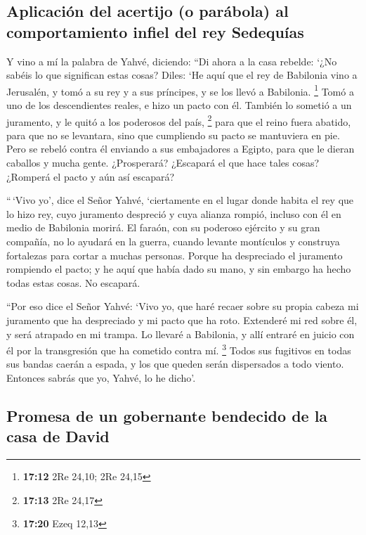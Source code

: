 \hypertarget{aplicaciuxf3n-del-acertijo-o-paruxe1bola-al-comportamiento-infiel-del-rey-sedequuxedas}{%
\subsection{Aplicación del acertijo (o parábola) al comportamiento
infiel del rey
Sedequías}\label{aplicaciuxf3n-del-acertijo-o-paruxe1bola-al-comportamiento-infiel-del-rey-sedequuxedas}}

 Y vino a mí la palabra de Yahvé, diciendo:
 ``Di ahora a la casa rebelde: `¿No sabéis lo que
significan estas cosas? Diles: `He aquí que el rey de Babilonia vino a
Jerusalén, y tomó a su rey y a sus príncipes, y se los llevó a
Babilonia. \footnote{\textbf{17:12} 2Re 24,10; 2Re 24,15}
 Tomó a uno de los descendientes reales, e hizo un pacto
con él. También lo sometió a un juramento, y le quitó a los poderosos
del país, \footnote{\textbf{17:13} 2Re 24,17}  para que
el reino fuera abatido, para que no se levantara, sino que cumpliendo su
pacto se mantuviera en pie.  Pero se rebeló contra él
enviando a sus embajadores a Egipto, para que le dieran caballos y mucha
gente. ¿Prosperará? ¿Escapará el que hace tales cosas? ¿Romperá el pacto
y aún así escapará?

 ``\,`Vivo yo', dice el Señor Yahvé, `ciertamente en el
lugar donde habita el rey que lo hizo rey, cuyo juramento despreció y
cuya alianza rompió, incluso con él en medio de Babilonia morirá.
 El faraón, con su poderoso ejército y su gran compañía,
no lo ayudará en la guerra, cuando levante montículos y construya
fortalezas para cortar a muchas personas.  Porque ha
despreciado el juramento rompiendo el pacto; y he aquí que había dado su
mano, y sin embargo ha hecho todas estas cosas. No escapará.

 ``Por eso dice el Señor Yahvé: `Vivo yo, que haré recaer
sobre su propia cabeza mi juramento que ha despreciado y mi pacto que ha
roto.  Extenderé mi red sobre él, y será atrapado en mi
trampa. Lo llevaré a Babilonia, y allí entraré en juicio con él por la
transgresión que ha cometido contra mí. \footnote{\textbf{17:20} Ezeq
  12,13}  Todos sus fugitivos en todas sus bandas caerán
a espada, y los que queden serán dispersados a todo viento. Entonces
sabrás que yo, Yahvé, lo he dicho'.

\hypertarget{promesa-de-un-gobernante-bendecido-de-la-casa-de-david}{%
\subsection{Promesa de un gobernante bendecido de la casa de
David}\label{promesa-de-un-gobernante-bendecido-de-la-casa-de-david}}

